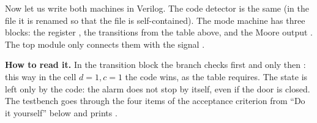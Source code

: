 Now let us write both machines in Verilog. The code detector is the same
 (in the file it is renamed  so that the file
is self-contained). The mode machine has three blocks: the register
, the transitions from the table above, and the Moore output
. The top module  only connects them with the
signal .


\textbf{How to read it.} In the transition block the  branch checks
 first and only then : this way in the cell $d{=}1,c{=}1$ the
code wins, as the table requires. The  state is left only by the
code: the alarm does not stop by itself, even if the door is closed. The
testbench  goes through the four items of the acceptance
criterion from ``Do it yourself'' below and prints .

